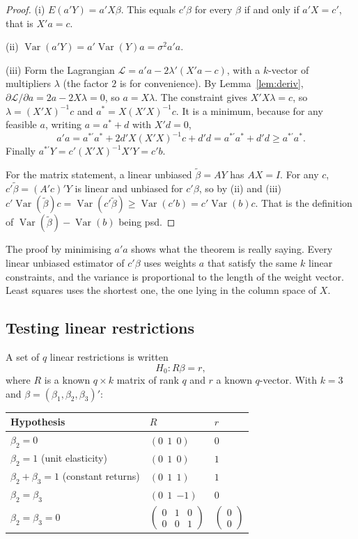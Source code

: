 \documentclass[11pt,a4paper]{article}
\numberwithin{equation}{section}
\DeclareMathOperator{\Var}{Var}
\theoremstyle{definition}
\begin{document}
\begin{proof}
(i) $E(a'Y) = a'X\beta$. This equals $c'\beta$ for every $\beta$ if and only if $a'X = c'$, that is $X'a = c$.

(ii) $\Var(a'Y) = a'\Var(Y)a = \sigma^2a'a$.

(iii) Form the Lagrangian $\mathcal L = a'a - 2\lambda'(X'a - c)$, with a $k$-vector of multipliers $\lambda$ (the factor $2$ is for convenience). By
Lemma~\ref{lem:deriv}, $\partial\mathcal L/\partial a = 2a - 2X\lambda = 0$, so $a = X\lambda$. The constraint gives $X'X\lambda = c$, so $\lambda = (X'X)^{-1}c$ and
$a^* = X(X'X)^{-1}c$. It is a minimum, because for any feasible $a$, writing $a = a^* + d$ with $X'd = 0$,
\[
a'a = a^{*\prime}a^* + 2d'X(X'X)^{-1}c + d'd = a^{*\prime}a^* + d'd \geq a^{*\prime}a^* .
\]
Finally $a^{*\prime}Y = c'(X'X)^{-1}X'Y = c'b$.

For the matrix statement, a linear unbiased $\tilde\beta = AY$ has $AX = I$. For any $c$, $c'\tilde\beta = (A'c)'Y$ is linear and unbiased for $c'\beta$, so by
(ii) and (iii) $c'\Var(\tilde\beta)c = \Var(c'\tilde\beta) \geq \Var(c'b) = c'\Var(b)c$. That is the definition of $\Var(\tilde\beta) - \Var(b)$ being psd.
\end{proof}

The proof by minimising $a'a$ shows what the theorem is really saying. Every linear unbiased estimator of $c'\beta$ uses weights $a$ that satisfy the
same $k$ linear constraints, and the variance is proportional to the length of the weight vector. Least squares uses the shortest one, the one
lying in the column space of $X$.

\subsection{Testing linear restrictions}
\label{ssec:rbeta}

A set of $q$ linear restrictions is written
\[
H_0\colon R\beta = r ,
\]
where $R$ is a known $q \times k$ matrix of rank $q$ and $r$ a known $q$-vector. With $k = 3$ and $\beta = (\beta_1, \beta_2, \beta_3)'$:
\begin{center}
\renewcommand{\arraystretch}{1.3}
\begin{tabular}{lll}
Hypothesis & $R$ & $r$\\\hline
$\beta_2 = 0$ & $(0\ \ 1\ \ 0)$ & $0$\\
$\beta_2 = 1$ (unit elasticity) & $(0\ \ 1\ \ 0)$ & $1$\\
$\beta_2 + \beta_3 = 1$ (constant returns) & $(0\ \ 1\ \ 1)$ & $1$\\
$\beta_2 = \beta_3$ & $(0\ \ 1\ \ {-1})$ & $0$\\
$\beta_2 = \beta_3 = 0$ & $\begin{pmatrix} 0 & 1 & 0 \\ 0 & 0 & 1 \end{pmatrix}$ & $\begin{pmatrix} 0 \\ 0 \end{pmatrix}$
\end{tabular}
\end{center}
\end{document}
